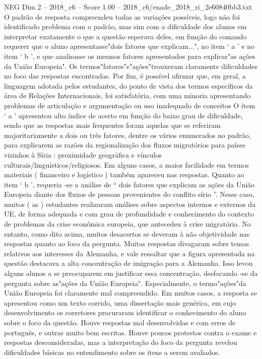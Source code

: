 \begin{textsample}{NEG Dim 2 – 2018\_c6 – Score 1.00 – 2018\_c6/enade\_2018\_ri\_2e60840bb3.txt}
O padrão de resposta compreendeu todas as variações possíveis, logo não foi identificado problema com o padrão, mas sim com a dificuldade dos alunos em interpretar exatamente o que a questão esperava deles, em função do comando requerer que o aluno apresentasse"dois fatores que explicam...", no item ‘ a ’ e no item ‘ b ’, e que analisasse os mesmos fatores apresentados para explicar"as ações da União Europeia".
Os termos"fatores"e"ações"trouxeram claramente dificuldades no foco das respostas encontradas.
Por fim, é possível afirmar que, em geral, a linguagem adotada pelos estudantes, do ponto de vista dos termos específicos da área de Relações Internacionais, foi satisfatória, com uma minoria apresentando problemas de articulação e argumentação ou uso inadequado de conceitos O item ‘ a ’ apresentou alto índice de acerto em função do baixo grau de dificuldade, sendo que as respostas mais frequentes foram aquelas que se referiram majoritariamente a dois ou três fatores, dentre os vários enumerados no padrão, para explicarem as razões da regionalização dos fluxos migratórios para países vizinhos à Síria : proximidade geográfica e vínculos culturais/linguísticos/religiosos.
Em alguns casos, a maior facilidade em termos materiais ( financeiro e logístico ) também apareceu nas respostas.
Quanto ao item ‘ b ’, requeria -se a análise de “ dois fatores que explicam as ações da União Europeia diante dos fluxos de pessoas provenientes do conflito sírio ”.
Nesse caso, muitos ( as ) estudantes realizaram análises sobre aspectos internos e externos da UE, de forma adequada e com grau de profundidade e conhecimento do contexto de problemas da crise econômica europeia, que antecedeu à crise migratória.
No entanto, como dito acima, muitos desacertos se deveram à não objetividade nas respostas quanto ao foco da pergunta.
Muitas respostas divagaram sobre temas relativos aos interesses da Alemanha, e vale ressaltar que a figura apresentada na questão destacava a alta concentração de imigração para a Alemanha.
Isso levou alguns alunos a se preocuparem em justificar essa concentração, desfocando -se da pergunta sobre as"ações da União Europeia".
Especialmente, o termo"ações"da União Europeia foi claramente mal compreendido.
Em muitos casos, a resposta se apresentou como um texto corrido, uma dissertação mais genérica, em cujo desenvolvimento os corretores procuraram identificar o conhecimento do aluno sobre o foco da questão.
Houve respostas mal desenvolvidas e com erros de português, e outras muito bem escritas.
Houve poucos protestos contra o exame e respostas desconsideradas, mas a interpretação do foco da pergunta revelou dificuldades básicas no entendimento sobre os itens a serem avaliados.

\end{textsample}
